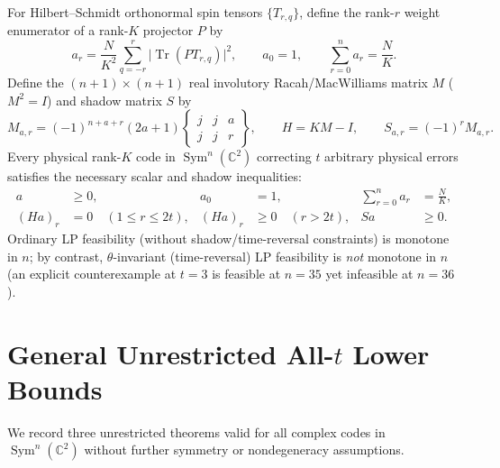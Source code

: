\documentclass[11pt,letterpaper]{article}
\theoremstyle{definition}
\theoremstyle{remark}
\newcommand{\Tr}{\operatorname{Tr}}
\newcommand{\Sym}{\operatorname{Sym}}
\newcommand{\C}{\mathbb{C}}
\begin{document}
For Hilbert--Schmidt orthonormal spin tensors $\{T_{r,q}\}$, define the rank-$r$ weight enumerator of a rank-$K$ projector $P$ by
\begin{equation}\label{eq:enumerator}
  a_r = \frac{N}{K^2} \sum_{q=-r}^{r} \bigl|\Tr(P T_{r,q})\bigr|^2, \qquad a_0 = 1, \qquad \sum_{r=0}^n a_r = \frac{N}{K}.
\end{equation}
Define the $(n+1)\times(n+1)$ real involutory Racah/MacWilliams matrix $M$ ($M^2 = I$) and shadow matrix $S$ by
\begin{equation}\label{eq:macwilliams}
  M_{a,r} = (-1)^{n+a+r}(2a+1)\begin{Bmatrix} j & j & a \\ j & j & r \end{Bmatrix}, \qquad H = KM - I, \qquad S_{a,r} = (-1)^r M_{a,r}.
\end{equation}
Every physical rank-$K$ code in $\Sym^n(\C^2)$ correcting $t$ arbitrary physical errors satisfies the necessary scalar and shadow inequalities:
\begin{equation}\label{eq:lp-cone}
\begin{aligned}
  a &\ge 0, & a_0 &= 1, & \sum_{r=0}^n a_r &= \frac{N}{K},\\
  (Ha)_r &= 0 \quad(1 \le r \le 2t), &
  (Ha)_r &\ge 0 \quad(r > 2t), & Sa &\ge 0.
\end{aligned}
\end{equation}
Ordinary LP feasibility (without shadow/time-reversal constraints) is monotone in $n$; by contrast, $\theta$-invariant (time-reversal) LP feasibility is \emph{not} monotone in $n$ (an explicit counterexample at $t=3$ is feasible at $n=35$ yet infeasible at $n=36$).

\section{General Unrestricted All-$t$ Lower Bounds}
We record three unrestricted theorems valid for all complex codes in $\Sym^n(\C^2)$ without further symmetry or nondegeneracy assumptions.
\end{document}
